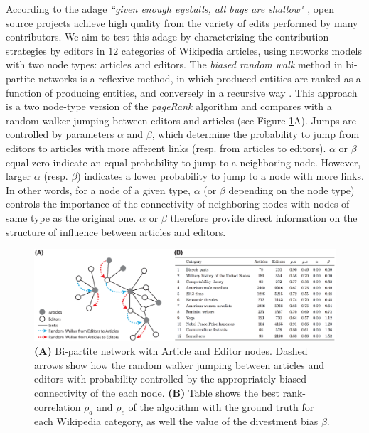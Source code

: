 \documentclass[letterpaper,9pt,a4paper]{article}
\begin{document}
\vspace{0.05cm}
According to the adage {\it ``given enough eyeballs, all bugs are shallow"} \cite{raymond1999}, open source projects achieve high quality from the variety of edits performed by many contributors. We aim to test this adage by characterizing the contribution strategies by editors in $12$ categories of Wikipedia articles, using networks models with two node types: articles and editors. The {\it biased random walk} method in bi-partite networks \cite{caldarelli2012network} is a reflexive method, in which produced entities are ranked as a function of producing entities, and conversely in a recursive way \cite{hidalgo2009}. This approach is a two node-type version of the {\it pageRank} algorithm \cite{page1999pagerank} and compares with a random walker jumping between editors and articles (see Figure \ref{fig1}A). Jumps are controlled by parameters $\alpha$ and $\beta$, which determine the probability to jump from editors to articles with more afferent links (resp. from articles to editors). $\alpha$ or $\beta$ equal zero indicate an equal probability to jump to a neighboring node. However, larger $\alpha$ (resp. $\beta$) indicates a lower probability to jump to a node with more links. In other words, for a node of a given type, $\alpha$ (or $\beta$ depending on the node type) controls the importance of the connectivity of neighboring nodes with nodes of same type as the original one. $\alpha$ or $\beta$ therefore provide direct information on the structure of influence between articles and editors.

\begin{figure}[h]
\centering
\includegraphics[width=1.\columnwidth]{Figures/figure_abstract.eps}
\caption{\footnotesize {\bf (A)} Bi-partite network with Article and Editor nodes. Dashed arrows show how the random walker jumping between articles and editors with  probability controlled by the appropriately biased connectivity of the each node. {\bf (B)} Table shows the best rank-correlation $\rho_a$ and $\rho_e$ of the algorithm with the ground truth for each Wikipedia category, as well the value of the divestment bias $\beta$.}
\label{fig1}
\end{figure}
\end{document}
